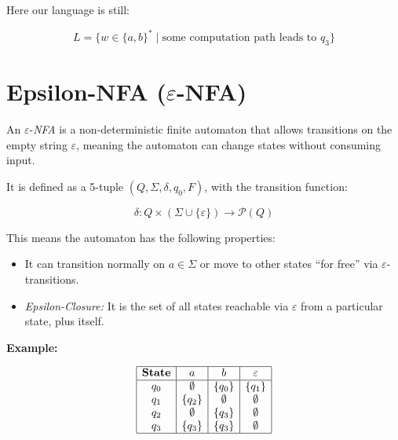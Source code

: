 Here our language is still:

\[
    L = \{ w \in \{a,b\}^* \mid \text{some computation path leads to } q_3 \}
\]

\section{Epsilon-NFA \texorpdfstring{(\(\varepsilon\)-NFA)}{}}  

An \(\varepsilon\)-\emph{NFA} is a non-deterministic finite automaton that allows transitions on the empty string 
\(\varepsilon\), meaning the automaton can change states without consuming input.

It is defined as a 5-tuple \((Q, \Sigma, \delta, q_0, F)\), with the transition function:

\[
    \delta: Q \times (\Sigma \cup \{\varepsilon\}) \to \mathcal{P}(Q)
\]

This means the automaton has the following properties:

\begin{itemize}
    
    \item It can transition normally on \(a \in \Sigma\) or move to other states ``for free'' via 
    \(\varepsilon\)-transitions.
    
    \item \emph{Epsilon-Closure:} It is the set of all states reachable via \(\varepsilon\) from a particular 
    state, plus itself. 

\end{itemize}

\textbf{Example:}

\[
    \begin{array}{|c|c|c|c|}
    \hline
    \textbf{State} & a & b & \varepsilon \\
    \hline
    q_0 & \emptyset & \{q_0\} & \{q_1\} \\
    q_1 & \{q_2\} & \emptyset & \emptyset \\
    q_2 & \emptyset & \{q_3\} & \emptyset \\
    q_3 & \{q_3\} & \{q_3\} & \emptyset \\
    \hline
    \end{array}
\]

\begin{center}
\end{center}

